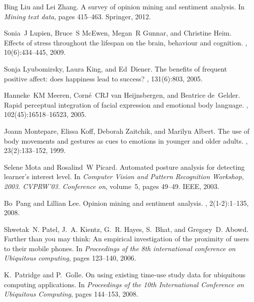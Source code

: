 \documentclass[12pt]{article}
\begin{document}
\begin{thebibliography}{10}
Bing Liu and Lei Zhang.
\newblock A survey of opinion mining and sentiment analysis.
\newblock In {\em Mining text data}, pages 415--463. Springer, 2012.

Sonia~J Lupien, Bruce~S McEwen, Megan~R Gunnar, and Christine Heim.
\newblock Effects of stress throughout the lifespan on the brain, behaviour and
  cognition.
, 10(6):434--445, 2009.

Sonja Lyubomirsky, Laura King, and Ed~Diener.
\newblock The benefits of frequent positive affect: does happiness lead to
  success?
, 131(6):803, 2005.

Hanneke~KM Meeren, Corn{\'e}~CRJ van Heijnsbergen, and Beatrice de~Gelder.
\newblock Rapid perceptual integration of facial expression and emotional body
  language.
, 102(45):16518--16523, 2005.

Joann Montepare, Elissa Koff, Deborah Zaitchik, and Marilyn Albert.
\newblock The use of body movements and gestures as cues to emotions in younger
  and older adults.
, 23(2):133--152, 1999.

Selene Mota and Rosalind~W Picard.
\newblock Automated posture analysis for detecting learner's interest level.
\newblock In {\em Computer Vision and Pattern Recognition Workshop, 2003.
  CVPRW'03. Conference on}, volume~5, pages 49--49. IEEE, 2003.

Bo~Pang and Lillian Lee.
\newblock Opinion mining and sentiment analysis.
, 2(1-2):1--135,
  2008.

Shwetak~N. Patel, J.~A. Kientz, G.~R. Hayes, S.~Bhat, and Gregory~D. Abowd.
\newblock Farther than you may think: An empirical investigation of the
  proximity of users to their mobile phones.
\newblock In {\em Proceedings of the 8th international conference on Ubiquitous
  computing}, pages 123--140, 2006.

K.~Patridge and P.~Golle.
\newblock On using existing time-use study data for ubiquitous computing
  applications.
\newblock In {\em Proceedings of the 10th International Conference on
  Ubiquitous Computing}, pages 144--153, 2008.


\end{thebibliography}
\end{document}
